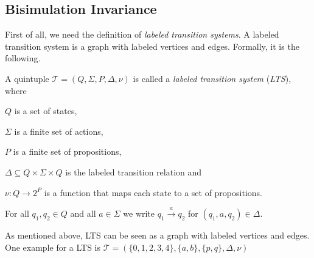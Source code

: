 
\subsection{Bisimulation Invariance}\label{subsec:bisimulationInvariance}

First of all, we need the definition of \textit{labeled transition systems}. A labeled transition system is a graph
with labeled vertices and edges. Formally, it is the following.

\begin{definition}
    \label{definition:lts}
    A quintuple $\mathcal{T} = (Q, \Sigma, P, \Delta, \nu)$ is called a \emph{labeled transition system} (\emph{LTS}),
    where
    \begin{compactitem}
        \item $Q$ is a set of states,
        \item $\Sigma$ is a finite set of actions,
        \item $P$ is a finite set of propositions,
        \item $\Delta \subseteq Q \times \Sigma \times Q$ is the labeled transition relation and
        \item $\nu: Q \rightarrow 2^P$ is a function that maps each state to a set of propositions.
    \end{compactitem}
\end{definition}

For all $q_1, q_2 \in Q$ and all $a \in \Sigma$ we write $q_1 \overset{a}{\rightarrow} q_2$ for $(q_1, a, q_2) \in
\Delta$.

\begin{example}
    As mentioned above, LTS can be seen as a graph with labeled vertices and edges. One example for a LTS is
    $\mathcal{T} = (\{0, 1, 2, 3, 4\}, \{a, b\}, \{p, q\}, \Delta, \nu)$
\begin{center}
\end{center}
\end{example}

